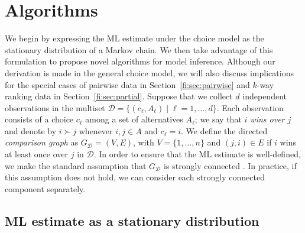 \section{Algorithms}
\label{fi:sec:algorithms}

We begin by expressing the ML estimate under the choice model as the stationary distribution of a Markov chain.
We then take advantage of this formulation to propose novel algorithms for model inference.
Although our derivation is made in the general choice model, we will also discuss implications for the special cases of pairwise data in Section~\ref{fi:sec:pairwise} and $k$-way ranking data in Section~\ref{fi:sec:partial}.
Suppose that we collect $d$ independent observations in the multiset $\mathcal{D} = \{(c_\ell, A_\ell) \mid \ell = 1, \ldots, d\}$.
Each observation consists of a choice $c_\ell$ among a set of alternatives $A_\ell$;
we say that \emph{$i$ wins over $j$} and denote by $i \succ j$ whenever $i, j \in A$ and $c_\ell = i$.
We define the directed \emph{comparison graph} as $G_{\mathcal{D}} = (V, E)$, with $V = \{1, \ldots, n \}$ and $(j, i) \in E$ if $i$ wins at least once over $j$ in $\mathcal{D}$.
In order to ensure that the ML estimate is well-defined, we make the standard assumption that $G_{\mathcal{D}}$ is strongly connected \citep{ford1957solution, hunter2004mm}.
In practice, if this assumption does not hold, we can consider each strongly connected component separately.

\subsection{ML estimate as a stationary distribution}

